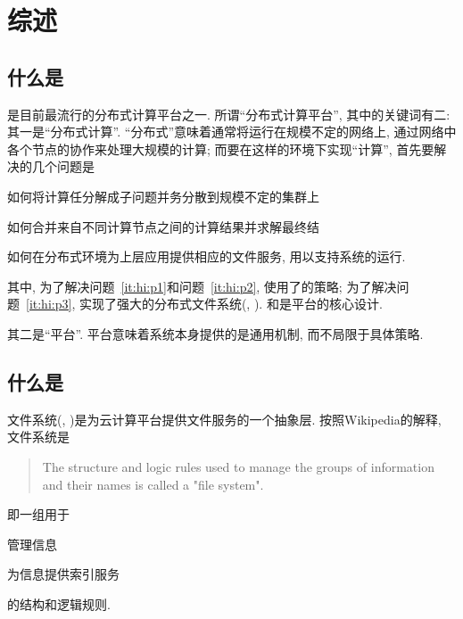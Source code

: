 %
\chapter{\HadoopFS 综述}
\label{ch:hfs-intro}


\section{什么是\Hadoop}
\label{ch:hfs-intro:hadoop}

\Hadoop 是目前最流行的分布式计算平台之一.
所谓``分布式计算平台'', 其中的关键词有二:
其一是``分布式计算''. ``分布式''意味着\Hadoop 通常将运行在规模不定的网络上,
通过网络中各个节点的协作来处理大规模的计算; 而要在这样的环境下实现``计算'',
首先要解决的几个问题是
\begin{XeEnum}
    \item\label{it:hi:p1} 如何将计算任分解成子问题并务分散到规模不定的集群上
    \item\label{it:hi:p2} 如何合并来自不同计算节点之间的计算结果并求解最终结
    \item\label{it:hi:p3} 如何在分布式环境为上层应用提供相应的文件服务, 用以支持\Hadoop 系统的运行.
\end{XeEnum}
其中, 为了解决问题~\ref{it:hi:p1}和问题~\ref{it:hi:p2},
\Hadoop 使用了\MapReduce 的策略;
为了解决问题~\ref{it:hi:p3}, \Hadoop 实现了强大的\Hadoop 分布式文件系统(\HadoopDFS, \HDFS).
\MapReduce 和\HDFS 是\Hadoop 平台的核心设计.

其二是``平台''. 平台意味着\Hadoop 系统本身提供的是通用机制, 而不局限于具体策略.

\section{什么是\HadoopFS}
\label{ch:hfs-intro:hfs}

\Hadoop 文件系统(\HadoopFS, \HFS)是为\Hadoop 云计算平台提供文件服务的一个抽象层.
按照Wikipedia的解释, 文件系统是
\begin{quote}
The structure and logic rules used to manage the groups of information and their names is called a "file system".
\end{quote}
即一组用于
\begin{XeEnum}
    \item 管理信息
    \item 为信息提供索引服务
\end{XeEnum}
的结构和逻辑规则.

